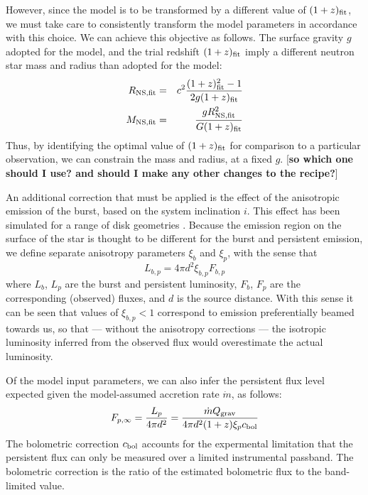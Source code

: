 \documentclass{aastex61}
\begin{document}
However, since the model is to be transformed by a different value of $(1+z)_{\rm fit}$, we must take care to consistently transform the model parameters in accordance with this choice.
%
We can achieve this objective as follows. The surface gravity $g$ adopted for the model, and the trial redshift $(1+z)_{\rm fit}$ imply a different neutron star mass and radius than adopted for the model: 
%
\begin{eqnarray}
R_{\rm NS,fit} &=& c^2\frac{(1+z)_{\rm fit}^2-1}{2g(1+z)_{\rm fit}}\\
M_{\rm NS,fit} &=& \frac{gR_{\rm NS,fit}^2}{G(1+z)_{\rm fit}}
\end{eqnarray}
Thus, by identifying the optimal value of $(1+z)_{\rm fit}$ for comparison to a particular observation, we can constrain the mass and radius, at a fixed $g$. [{\bf so which one should I use? and should I make any other changes to the recipe?}]

An additional correction that must be applied is the effect of the anisotropic emission of the burst, based on the system inclination $i$. This effect has been simulated for a range of disk geometries \cite[e.g.][]{he16}. Because the emission region on the surface of the star is thought to be different for the burst and persistent emission, we define separate anisotropy parameters $\xi_b$ and $\xi_p$, with the sense that
\begin{equation}
L_{b,p} = 4\pi d^2\xi_{b,p}F_{b,p}
\end{equation}
where $L_b$, $L_p$ are the burst and persistent luminosity, $F_b$, $F_p$ are the corresponding (observed) fluxes, and $d$ is the source distance. With this sense it can be seen that values of $\xi_{b,p}<1$ correspond to emission preferentially beamed towards us, so that --- without the anisotropy corrections --- the isotropic luminosity inferred from the observed flux would overestimate the actual luminosity.

Of the model input parameters, we can also infer the persistent flux level expected given the model-assumed accretion rate $\dot{m}$, as follows: %
\begin{equation}
F_{p,\infty} = \frac{L_p}{4\pi d^2} = 
\frac{\dot{m} Q_{\rm grav}}{4\pi d^2 (1+z)\xi_p c_{\rm bol}}
\end{equation}
%
The bolometric correction $c_{\rm bol}$ accounts for the expermental limitation that the persistent flux can only be measured over a limited instrumental passband. The bolometric correction is the ratio of the estimated bolometric flux to the band-limited value.
\end{document}
